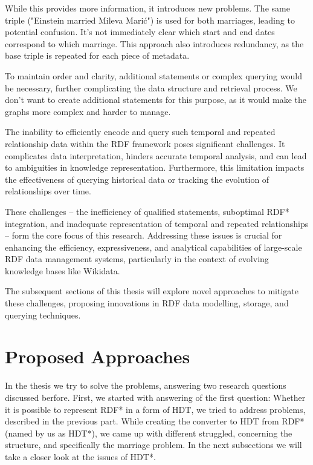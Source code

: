 While this provides more information, it introduces new problems. The same triple ("Einstein married Mileva Marić") is used for both marriages, leading to potential confusion. It's not immediately clear which start and end dates correspond to which marriage. This approach also introduces redundancy, as the base triple is repeated for each piece of metadata.

To maintain order and clarity, additional statements or complex querying would be necessary, further complicating the data structure and retrieval process. We don't want to create additional statements for this purpose, as it would make the graphs more complex and harder to manage.

The inability to efficiently encode and query such temporal and repeated relationship data within the RDF framework poses significant challenges. It complicates data interpretation, hinders accurate temporal analysis, and can lead to ambiguities in knowledge representation. Furthermore, this limitation impacts the effectiveness of querying historical data or tracking the evolution of relationships over time.

These challenges – the inefficiency of qualified statements, suboptimal RDF* integration, and inadequate representation of temporal and repeated relationships – form the core focus of this research. Addressing these issues is crucial for enhancing the efficiency, expressiveness, and analytical capabilities of large-scale RDF data management systems, particularly in the context of evolving knowledge bases like Wikidata.

The subsequent sections of this thesis will explore novel approaches to mitigate these challenges, proposing innovations in RDF data modelling, storage, and querying techniques. 



\section{Proposed Approaches}
In the thesis we try to solve the problems, answering two research questions discussed berfore. First, we started with answering of the first question: Whether it is possible to represent RDF* in a form of HDT, we tried to address problems, described in the previous part. While creating the converter to HDT from RDF* (named by us as HDT*), we came up with different struggled, concerning the structure, and specifically the marriage problem. In the next subsections we will take a closer look at the issues of HDT*.

